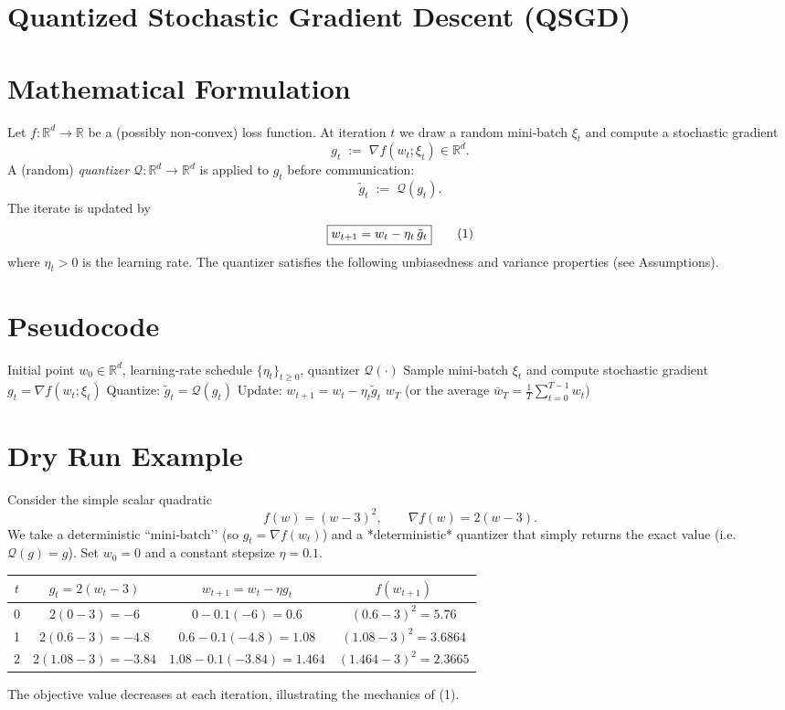 \documentclass{article}
\newcommand{\R}{\mathbb{R}}
\newcommand{\Q}{\mathcal{Q}}
\newcommand{\grad}{\nabla}
\begin{document}
\section*{Quantized Stochastic Gradient Descent (QSGD)}

\section*{Mathematical Formulation}
Let $f:\R^d\to\R$ be a (possibly non‑convex) loss function.  
At iteration $t$ we draw a random mini‑batch $\xi_t$ and compute a stochastic gradient
\[
g_t \;:=\; \grad f(w_t;\xi_t)\in\R^d .
\]
A (random) \emph{quantizer} $\Q:\R^d\to\R^d$ is applied to $g_t$ before communication:
\[
\tilde g_t \;:=\; \Q(g_t).
\]
The iterate is updated by
\begin{equation}
\boxed{%
w_{t+1}=w_t-\eta_t \,\tilde g_t
}
\tag{1}
\end{equation}
where $\eta_t>0$ is the learning rate.  
The quantizer satisfies the following unbiasedness and variance properties (see Assumptions).

\section*{Pseudocode}
\begin{algorithm}[H]
\caption{Quantized Stochastic Gradient Descent}
\begin{algorithmic}[1]
\REQUIRE Initial point $w_0\in\R^d$, learning‑rate schedule $\{\eta_t\}_{t\ge0}$, quantizer $\Q(\cdot)$
    \STATE Sample mini‑batch $\xi_t$ and compute stochastic gradient $g_t=\grad f(w_t;\xi_t)$
    \STATE Quantize: $\tilde g_t =\Q(g_t)$
    \STATE Update: $w_{t+1}=w_t-\eta_t \tilde g_t$
\ENDFOR
\RETURN $w_T$ (or the average $\bar w_T=\tfrac1T\sum_{t=0}^{T-1}w_t$)
\end{algorithmic}
\end{algorithm}

\section*{Dry Run Example}
Consider the simple scalar quadratic
\[
f(w)=(w-3)^2,\qquad \grad f(w)=2(w-3).
\]
We take a deterministic “mini‑batch’’ (so $g_t=\grad f(w_t)$) and a *deterministic* quantizer that simply returns the exact value (i.e. $\Q(g)=g$).  
Set $w_0=0$ and a constant stepsize $\eta=0.1$.

\begin{center}
\begin{tabular}{c|c|c|c}
$t$ & $g_t=2(w_t-3)$ & $w_{t+1}=w_t-\eta g_t$ & $f(w_{t+1})$ \\ \hline
0 & $2(0-3)=-6$ & $0-0.1(-6)=0.6$ & $(0.6-3)^2=5.76$\\
1 & $2(0.6-3)=-4.8$ & $0.6-0.1(-4.8)=1.08$ & $(1.08-3)^2=3.6864$\\
2 & $2(1.08-3)=-3.84$ & $1.08-0.1(-3.84)=1.464$ & $(1.464-3)^2=2.3665$
\end{tabular}
\end{center}
The objective value decreases at each iteration, illustrating the mechanics of (1).
\end{document}

